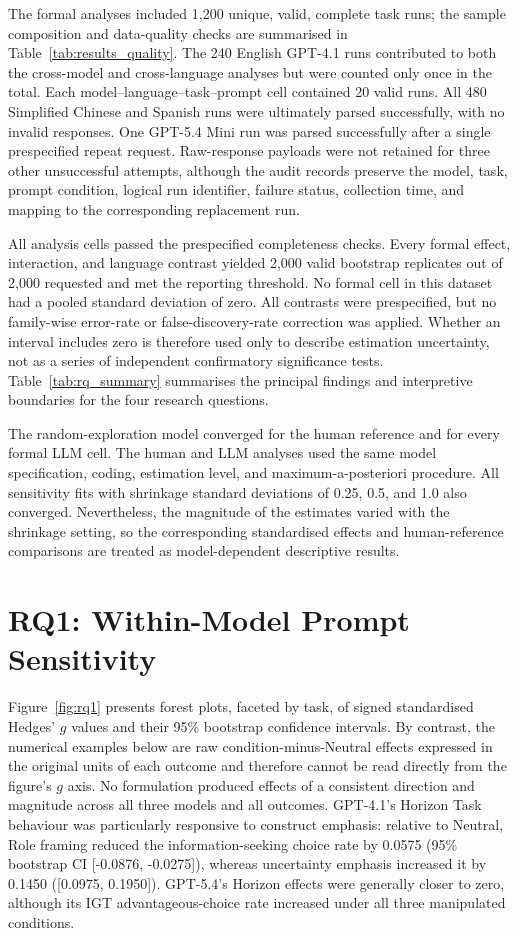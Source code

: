 \documentclass[logo,msc]{infthesis}
\begin{document}
The formal analyses included 1,200 unique, valid, complete task runs; the sample composition and data-quality checks are summarised in Table~\ref{tab:results_quality}. The 240 English GPT-4.1 runs contributed to both the cross-model and cross-language analyses but were counted only once in the total. Each model--language--task--prompt cell contained 20 valid runs. All 480 Simplified Chinese and Spanish runs were ultimately parsed successfully, with no invalid responses. One GPT-5.4 Mini run was parsed successfully after a single prespecified repeat request. Raw-response payloads were not retained for three other unsuccessful attempts, although the audit records preserve the model, task, prompt condition, logical run identifier, failure status, collection time, and mapping to the corresponding replacement run.

All analysis cells passed the prespecified completeness checks. Every formal effect, interaction, and language contrast yielded 2,000 valid bootstrap replicates out of 2,000 requested and met the reporting threshold. No formal cell in this dataset had a pooled standard deviation of zero. All contrasts were prespecified, but no family-wise error-rate or false-discovery-rate correction was applied. Whether an interval includes zero is therefore used only to describe estimation uncertainty, not as a series of independent confirmatory significance tests. Table~\ref{tab:rq_summary} summarises the principal findings and interpretive boundaries for the four research questions.

The random-exploration model converged for the human reference and for every formal LLM cell. The human and LLM analyses used the same model specification, coding, estimation level, and maximum-a-posteriori procedure. All sensitivity fits with shrinkage standard deviations of 0.25, 0.5, and 1.0 also converged. Nevertheless, the magnitude of the estimates varied with the shrinkage setting, so the corresponding standardised effects and human-reference comparisons are treated as model-dependent descriptive results.

\section{RQ1: Within-Model Prompt Sensitivity}

Figure~\ref{fig:rq1} presents forest plots, faceted by task, of signed standardised Hedges' \(g\) values and their 95\% bootstrap confidence intervals. By contrast, the numerical examples below are raw condition-minus-Neutral effects expressed in the original units of each outcome and therefore cannot be read directly from the figure's \(g\) axis. No formulation produced effects of a consistent direction and magnitude across all three models and all outcomes. GPT-4.1's Horizon Task behaviour was particularly responsive to construct emphasis: relative to Neutral, Role framing reduced the information-seeking choice rate by 0.0575 (95\% bootstrap CI [-0.0876, -0.0275]), whereas uncertainty emphasis increased it by 0.1450 ([0.0975, 0.1950]). GPT-5.4's Horizon effects were generally closer to zero, although its IGT advantageous-choice rate increased under all three manipulated conditions.
\end{document}
